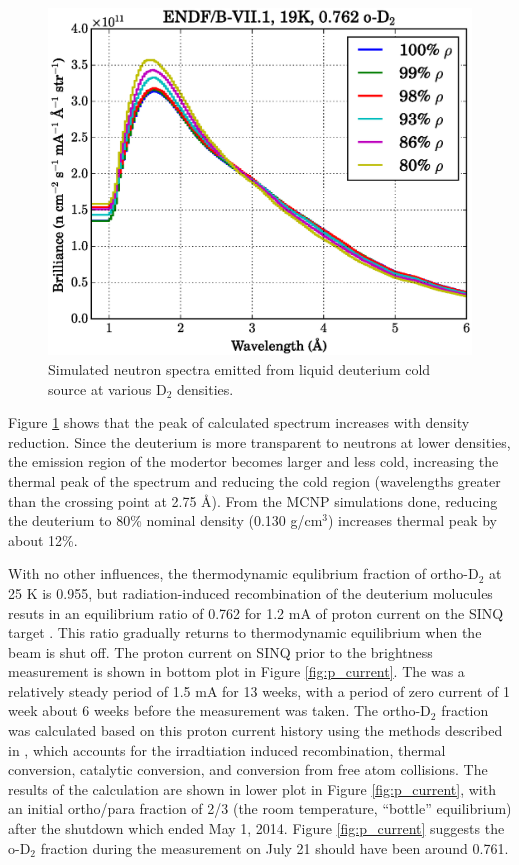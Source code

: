 \documentclass[5p,12pt]{elsarticle}
\begin{document}
\begin{figure}[h!] 
  \centering
    \includegraphics[width=\columnwidth]{graphics/density_compare.eps}
     \caption{Simulated neutron spectra emitted from liquid deuterium cold source at various D$_2$ densities. \label{fig:density_compare}}
\end{figure}

Figure \ref{fig:density_compare} shows that the peak of calculated spectrum increases with density reduction.  Since the deuterium is more transparent to neutrons at lower densities, the emission region of the modertor becomes larger and less cold, increasing the thermal peak of the spectrum and reducing the cold region (wavelengths greater than the crossing point at 2.75 {\AA}).  From the MCNP simulations done, reducing the deuterium to 80\% nominal density (0.130 g/cm$^3$) increases thermal peak by about 12\%.

With no other influences, the thermodynamic equlibrium fraction of ortho-D$_2$ at 25 K is 0.955, but radiation-induced recombination of the deuterium molucules resuts in an equilibrium ratio of 0.762 for 1.2 mA of proton current on the SINQ target \cite{op_equi}.  This ratio gradually returns to thermodynamic equilibrium when the beam is shut off.  The proton current on SINQ prior to the brightness measurement is shown in bottom plot in Figure \ref{fig:p_current}.  The was a relatively steady period of 1.5 mA for 13 weeks, with a period of zero current of 1 week about 6 weeks before the measurement was taken.  The ortho-D$_2$ fraction was calculated based on this proton current history using the methods described in \cite{op_equi}, which accounts for the irradtiation induced recombination, thermal conversion, catalytic conversion, and conversion from free atom collisions.  The results of the calculation are shown in lower plot in Figure \ref{fig:p_current}, with an initial ortho/para fraction of 2/3 (the room temperature, ``bottle'' equilibrium) after the shutdown which ended May 1, 2014.  Figure \ref{fig:p_current} suggests the o-D$_2$ fraction during the measurement on July 21 should have been around 0.761.
\end{document}
